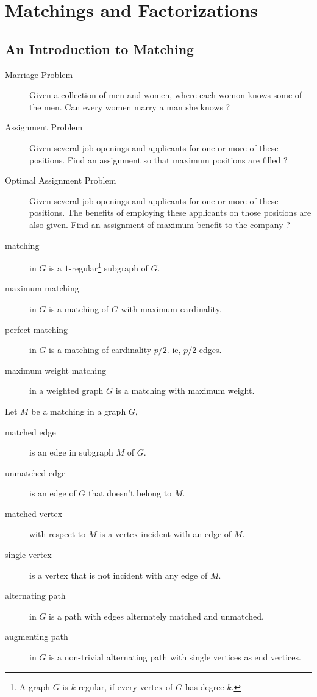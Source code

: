 \chapter{Matchings and Factorizations}
\section{An Introduction to Matching}
\begin{description}
	\item[Marriage Problem] Given a collection of men and women, where each womon knows some of the men. Can every women marry a man she knows ?
	\item[Assignment Problem] Given several job openings and applicants for one or more of these positions. Find an assignment so that maximum positions are filled ?
	\item[Optimal Assignment Problem] Given several job openings and applicants for one or more of these positions. The benefits of employing these applicants on those positions are also given. Find an assignment of maximum benefit to the company ?
\end{description}

\begin{description}
	\item[matching] in $G$ is a $1$-regular\footnote{A graph $G$ is $k$-regular, if every vertex of $G$ has degree $k$.} subgraph of $G$.
	\item[maximum matching] in $G$ is a matching of $G$ with maximum cardinality.
	\item[perfect matching] in $G$ is a matching of cardinality $p/2$. ie, $p/2$ edges.
	\item[maximum weight matching] in a weighted graph $G$ is a matching with maximum weight.
\end{description}

\begin{definition}
	Let $M$ be a matching in a graph $G$,
	\begin{description}
		\item[matched edge] is an edge in subgraph $M$ of $G$.
		\item[unmatched edge] is an edge of $G$ that doesn't belong to $M$.
		\item[matched vertex] with respect to $M$ is a vertex incident with an edge of $M$.
		\item[single vertex] is a vertex that is not incident with any edge of $M$.
		\item[alternating path] in $G$ is a path with edges alternately matched and unmatched.
		\item[augmenting path] in $G$ is a non-trivial alternating path with single vertices as end vertices.
	\end{description}
\end{definition}

